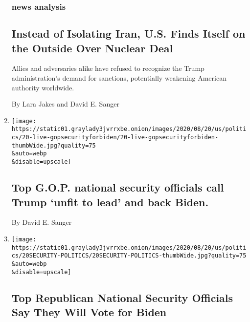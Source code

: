 \begin{enumerate}
  \hypertarget{news-analysis-2}{%
  \subsubsection{news analysis}\label{news-analysis-2}}

  \hypertarget{instead-of-isolating-iran-us-finds-itself-on-the-outside-over-nuclear-deal}{%
  \subsection{Instead of Isolating Iran, U.S. Finds Itself on the
  Outside Over Nuclear
  Deal}\label{instead-of-isolating-iran-us-finds-itself-on-the-outside-over-nuclear-deal}}

  Allies and adversaries alike have refused to recognize the Trump
  administration's demand for sanctions, potentially weakening American
  authority worldwide.

  By Lara Jakes and David E. Sanger
\item
  \href{/2020/08/20/us/elections/top-gop-national-security-officials-call-trump-unfit-to-lead-and-back-biden.html}{}

  \texttt{[image: https://static01.graylady3jvrrxbe.onion/images/2020/08/20/us/politics/20-live-gopsecurityforbiden/20-live-gopsecurityforbiden-thumbWide.jpg?quality=75\\\&auto=webp\\\&disable=upscale]}

  \hypertarget{top-gop-national-security-officials-call-trump-unfit-to-lead-and-back-biden}{%
  \subsection{Top G.O.P. national security officials call Trump `unfit
  to lead' and back
  Biden.}\label{top-gop-national-security-officials-call-trump-unfit-to-lead-and-back-biden}}

  By David E. Sanger
\item
  \href{/2020/08/20/us/politics/republican-national-security-biden.html}{}

  \texttt{[image: https://static01.graylady3jvrrxbe.onion/images/2020/08/20/us/politics/20SECURITY-POLITICS/20SECURITY-POLITICS-thumbWide.jpg?quality=75\\\&auto=webp\\\&disable=upscale]}

  \hypertarget{top-republican-national-security-officials-say-they-will-vote-for-biden}{%
  \subsection{Top Republican National Security Officials Say They Will
  Vote for
  Biden}\label{top-republican-national-security-officials-say-they-will-vote-for-biden}}


\end{enumerate}
